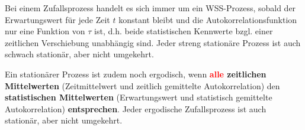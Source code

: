 Bei einem Zufallsprozess handelt es sich immer um ein WSS-Prozess, sobald der Erwartungswert
für jede Zeit $t$ konstant bleibt und die Autokorrelationsfunktion nur eine Funktion von $\tau$ ist,
d.h. beide statistischen Kennwerte bzgl. einer zeitlichen Verschiebung unabhängig sind.    
Jeder streng stationäre Prozess ist auch schwach stationär, aber nicht umgekehrt. 
        


Ein stationärer Prozess ist zudem noch ergodisch, wenn \textbf{\textcolor{red}{alle} zeitlichen
Mittelwerten} (Zeitmittelwert und zeitlich gemittelte Autokorrelation) den \textbf{statistischen
Mittelwerten} (Erwartungswert und statistisch gemittelte Autokorrelation)
\textbf{entsprechen}. Jeder ergodische Zufallsprozess ist auch stationär, aber
nicht umgekehrt.


